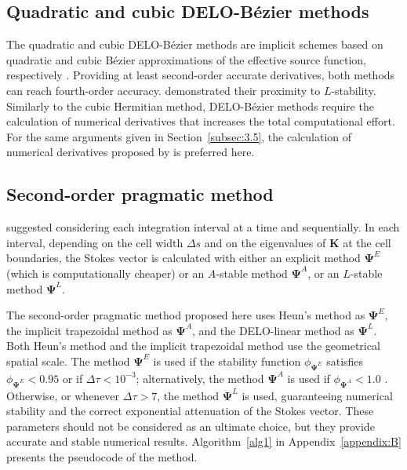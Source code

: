 \documentclass[iop,numberedappendix,twocolappendix,twocolumn]{emulateapj}
\begin{document}
\subsection{Quadratic and cubic DELO-B\'ezier methods}\label{subsec:3.4}
%
The quadratic and cubic DELO-B\'ezier  methods are implicit schemes based on quadratic and cubic B\'ezier approximations of the effective source function, respectively \citep{delacruz_rodriguez+piskunov2013}.
Providing at least second-order accurate derivatives, both methods can reach fourth-order accuracy.
\citet{janett2018a} demonstrated their proximity to $L$-stability.
Similarly to the cubic Hermitian method, DELO-B\'ezier methods require the calculation of numerical derivatives
that increases the total computational effort.
For the same arguments given in Section~\ref{subsec:3.5}, the calculation of numerical derivatives proposed by
\citet{steffen1990} is preferred here.
% 
%
\subsection{Second-order pragmatic method}
%
\citet{janett2018a} suggested considering each integration interval at a time and sequentially.
In each interval, depending on the cell width $\Delta s$ and on the
eigenvalues of $\mathbf{K}$ at the cell boundaries,
the Stokes vector is calculated with either
an explicit method $\mathbf{\Psi}^E$ (which is computationally cheaper) %
or an $A$-stable method $\mathbf{\Psi}^A$, or an $L$-stable method $\mathbf{\Psi}^L$.

The second-order pragmatic method proposed here uses
Heun's method as $\mathbf{\Psi}^E$, the implicit trapezoidal method as $\mathbf{\Psi}^A$,
and the DELO-linear method  as $\mathbf{\Psi}^L$.
Both Heun's method and the implicit trapezoidal method use the geometrical spatial scale. 
The method $\mathbf{\Psi}^E$ is used if the stability function $\phi_{\mathbf{\Psi}^E}$ satisfies $\phi_{\mathbf{\Psi}^E}<0.95$
or if $\Delta\tau<10^{-3}$;
alternatively, the method $\mathbf{\Psi}^A$ is used if $\phi_{\mathbf{\Psi}^A}<1.0$ \citep[see][Sect. 6]{janett2018a}.
Otherwise, or whenever $\Delta\tau>7$, the method $\mathbf{\Psi}^L$ is used,
guaranteeing numerical stability and the correct exponential attenuation of the Stokes vector.
These parameters should not be considered as an ultimate choice,
but they provide accurate and stable numerical results.
Algorithm~\ref{alg1} in Appendix~\ref{appendix:B} presents the pseudocode of the method.
\end{document}
